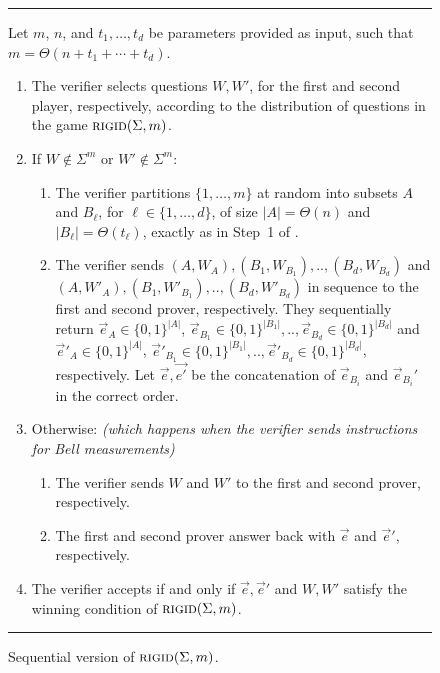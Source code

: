 \documentclass{toc}
\newcommand{\rigid}{\textsc{rigid}}
\begin{document}
\begin{figure}[H]
\rule[1ex]{\textwidth}{0.5pt}
\vspace{-25pt}
\justify 
Let $m$, $n$, and $t_1,\ldots,t_d$ be parameters provided as input, such that $m = \Theta(n+t_1+\cdots+t_d)$. 
\begin{enumerate}
\item The verifier selects questions $W,W'$, for the first and second player,
%
respectively, according to the distribution of questions in the game $\rigid(\Sigma,m)$.
\item If $W \not\in \Sigma^m$ or $W' \not\in \Sigma^m$: 
\begin{enumerate}
\item The verifier partitions $\{1,\ldots,m\}$ at random into subsets $A$ and $B_\ell$, for $\ell\in\{1,\ldots,d\}$, of size $|A|=\Theta(n)$ and $|B_\ell|=\Theta(t_\ell)$, exactly as in Step~1 of . 
\item The verifier sends $(A,W_A), (B_1,W_{B_1}),.., (B_d,W_{B_d})$ and $(A,W'_A), (B_1,W'_{B_1}), .., (B_d,W'_{B_d})$ in sequence to the first and second prover, %
respectively. They sequentially return %
 $\vec{e}_A \in \{0,1\}^{|A|}$, $\vec{e}_{B_1} \in \{0,1\}^{|B_1|},.., \vec{e}_{B_d} \in \{0,1\}^{|B_d|}$ and $\vec{e}'_A \in \{0,1\}^{|A|}$, $\vec{e}'_{B_1} \in \{0,1\}^{|B_1|},.., \vec{e}'_{B_d} \in \{0,1\}^{|B_d|}$,
respectively.  %
Let $\vec{e},\vec{e'}$ be the concatenation of $\vec{e}_{B_i}$ and $\vec{e}_{B_i}'$ in the correct order.
\end{enumerate}
\item Otherwise: \textit{(which happens when the verifier sends instructions for Bell measurements)} 
\begin{enumerate}
    \item The verifier sends $W$ and $W'$ to the first and second prover, respectively. 
    \item The %
%
first and second prover answer  %
back with $\vec{e}$ and $\vec{e}'$, respectively.
\end{enumerate}

\item The verifier accepts if and only if $\vec{e},\vec{e}'$ and $W,W'$ satisfy the winning condition of $\rigid(\Sigma,m)$.
\end{enumerate}
\rule[2ex]{\textwidth}{0.5pt}\vspace{-.5cm}
\caption{Sequential version of $\rigid(\Sigma,m)$.}
\label{fig:consistency-game}
\label{fig:rigidity-sequential}
\end{figure} 
\end{document}
